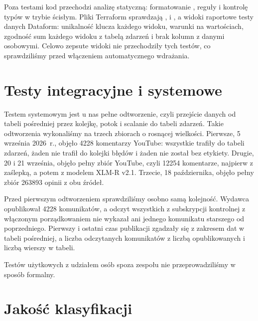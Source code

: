 Poza testami kod przechodzi analizę statyczną: formatowanie , reguły  i kontrolę typów  w trybie ścisłym.
Pliki Terraform sprawdzają ,  i , a widoki raportowe testy danych Dataform: unikalność klucza każdego widoku, warunki na wartościach, zgodność sum każdego widoku z tabelą zdarzeń i brak kolumn z danymi osobowymi.
Celowo zepsute widoki nie przechodziły tych testów, co sprawdziliśmy przed włączeniem automatycznego wdrażania.

\section{Testy integracyjne i systemowe}
\label{sec:eval-system}

Testem systemowym jest u nas pełne odtworzenie, czyli przejście danych od tabeli pośredniej przez kolejkę, potok i scalanie do tabeli zdarzeń.
Takie odtworzenia wykonaliśmy na trzech zbiorach o rosnącej wielkości.
Pierwsze, 5 września 2026~r., objęło \num{4228} komentarzy YouTube: wszystkie trafiły do tabeli zdarzeń, żaden nie trafił do kolejki błędów i żaden nie został bez etykiety.
Drugie, 20 i 21 września, objęło pełny zbiór YouTube, czyli \num{12254} komentarze, najpierw z zaślepką, a potem z modelem XLM-R v2.1.
Trzecie, 18 października, objęło pełny zbiór \num{263893} opinii z obu źródeł.

Przed pierwszym odtworzeniem sprawdziliśmy osobno samą kolejność.
Wydawca opublikował \num{4228} komunikatów, a odczyt wszystkich z subskrypcji kontrolnej z włączonym porządkowaniem nie wykazał ani jednego komunikatu starszego od poprzedniego.
Pierwszy i ostatni czas publikacji zgadzały się z zakresem dat w tabeli pośredniej, a liczba odczytanych komunikatów z liczbą opublikowanych i liczbą wierszy w tabeli.

Testów użytkowych z udziałem osób spoza zespołu nie przeprowadziliśmy w sposób formalny.

\section{Jakość klasyfikacji}
\label{sec:eval-quality}


